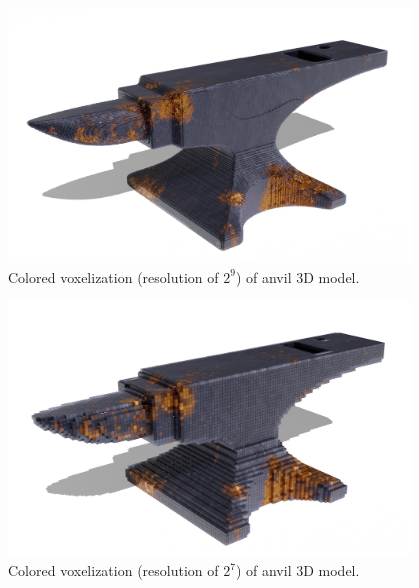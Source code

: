 \begin{figure}[htp]
    \centering
    \includegraphics[width=0.95\textwidth]{sections/result/figures/anvil-voxelized-v1-color-512.png}
    \caption{Colored voxelization (resolution of $2^9$) of anvil 3D model.}
    \label{fig:result-anvil-voxelization-high}
\end{figure}
\begin{figure}[htp]
    \centering
    \includegraphics[width=0.95\textwidth]{sections/result/figures/anvil-voxelized-v1-color-128.png}
    \caption{Colored voxelization (resolution of $2^7$) of anvil 3D model.}
    \label{fig:result-anvil-voxelization-low}
\end{figure}
